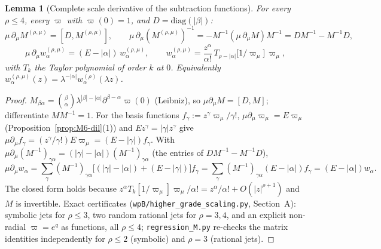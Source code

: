 \documentclass{article}
\newtheorem{lemma}[proposition]{Lemma}
\theoremstyle{remark}
\begin{document}
\begin{lemma}[Complete scale derivative of the subtraction functions]
\label{lem:wpB-dw}
For every $\rho\le4$, every $\varpi$ with $\varpi(0)=1$, and $D=\mathrm{diag}(|\beta|)$:
\[
\mu\,\partial_\mu M^{(\rho,\mu)}=[D,M^{(\rho,\mu)}],\qquad
\mu\,\partial_\mu (M^{(\rho,\mu)})^{-1}=-M^{-1}(\mu\,\partial_\mu M)M^{-1}=D M^{-1}-M^{-1}D,
\]
\[
\mu\,\partial_\mu w^{(\rho,\mu)}_\alpha=(E-|\alpha|)\,w^{(\rho,\mu)}_\alpha,\qquad
w^{(\rho,\mu)}_\alpha=\frac{z^\alpha}{\alpha!}\,T_{\rho-|\alpha|}\!\bigl[1/\varpi_\mu\bigr]\,\varpi_\mu ,
\]
with $T_k$ the Taylor polynomial of order $k$ at $0$. Equivalently $w^{(\rho,\mu)}_\alpha(z)=\lambda^{-|\alpha|}w^{(\rho)}_\alpha(\lambda z)$.
\end{lemma}
\begin{proof}
$M_{\beta\alpha}=\binom\beta\alpha\lambda^{|\beta|-|\alpha|}\partial^{\beta-\alpha}\varpi(0)$ (Leibniz), so $\mu\partial_\mu M=[D,M]$; differentiate $MM^{-1}=1$.
For the basis functions $f_\gamma:=z^\gamma\varpi_\mu/\gamma!$, $\mu\partial_\mu\varpi_\mu=E\varpi_\mu$ (Proposition~\ref{prop:M6-dil}(1)) and $Ez^\gamma=|\gamma|z^\gamma$ give $\mu\partial_\mu f_\gamma=(z^\gamma/\gamma!)E\varpi_\mu=(E-|\gamma|)f_\gamma$.
With $\mu\partial_\mu(M^{-1})_{\gamma\alpha}=(|\gamma|-|\alpha|)(M^{-1})_{\gamma\alpha}$ (the entries of $DM^{-1}-M^{-1}D$),
\[
\mu\partial_\mu w_\alpha=\sum_\gamma(M^{-1})_{\gamma\alpha}\bigl[(|\gamma|-|\alpha|)+(E-|\gamma|)\bigr]f_\gamma=\sum_\gamma(M^{-1})_{\gamma\alpha}(E-|\alpha|)f_\gamma=(E-|\alpha|)w_\alpha .
\]
The closed form holds because $z^\alpha T_k[1/\varpi_\mu]\varpi_\mu/\alpha!=z^\alpha/\alpha!+O(|z|^{\rho+1})$ and $M$ is invertible.
Exact certificates (\texttt{wpB/higher\_grade\_scaling.py}, Section~A): symbolic jets for $\rho\le3$, two random rational jets for $\rho=3,4$, and an explicit non-radial $\varpi=e^{q}$ as functions, all $\rho\le4$; \texttt{regression\_M.py} re-checks the matrix identities independently for $\rho\le2$ (symbolic) and $\rho=3$ (rational jets).
\end{proof}
\end{document}
